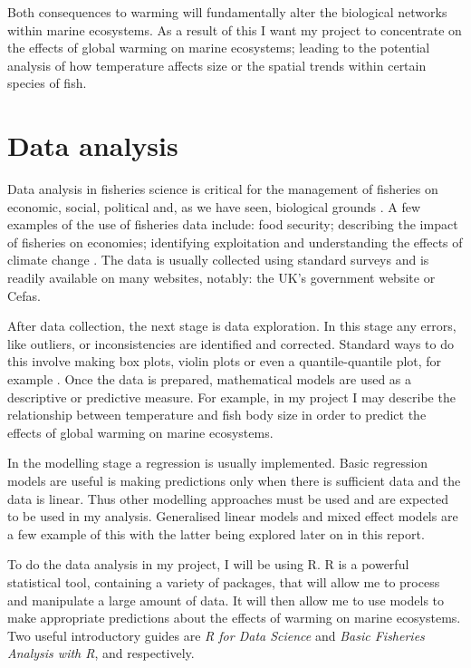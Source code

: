\documentclass{article}
\begin{document}
Both consequences to warming will fundamentally alter the biological networks within marine ecosystems. As a result of this I want my project to concentrate on the effects of global warming on marine ecosystems; leading to the potential analysis of how temperature affects size or the spatial trends within certain species of fish.

\section{Data analysis}

Data analysis in fisheries science is critical for the management of fisheries on economic, social, political and, as we have seen, biological grounds \cite{9}. A few examples of the use of fisheries data include: food security; describing the impact of fisheries on economies; identifying exploitation and understanding the effects of climate change \cite{10}. The data is usually collected using standard surveys and is readily available on many websites, notably: the UK’s government website or Cefas.

After data collection, the next stage is data exploration. In this stage any errors, like outliers, or inconsistencies are identified and corrected. Standard ways to do this involve making box plots, violin plots or even a quantile-quantile plot, for example \cite{9}. Once the data is prepared, mathematical models are used as a descriptive or predictive measure. For example, in my project I may describe the relationship between temperature and fish body size in order to predict the effects of global warming on marine ecosystems. 

In the modelling stage a regression is usually implemented. Basic regression models are useful is making predictions only when there is sufficient data and the data is linear. Thus other modelling approaches must be used and are expected to be used in my analysis. Generalised linear models and mixed effect models \cite{9} are a few example of this with the latter being explored later on in this report.

To do the data analysis in my project, I will be using R. R is a powerful statistical tool, containing a variety of packages, that will allow me to process and manipulate a large amount of data. It will then allow me to use models to make appropriate predictions about the effects of warming on marine ecosystems. Two useful introductory guides are \textit{R for Data Science} and \textit{Basic Fisheries Analysis with R}, \cite{11} and \cite{12} respectively.
 
\end{document}
